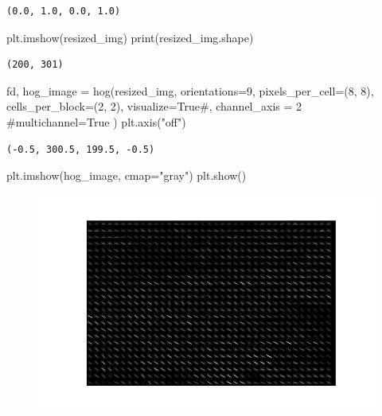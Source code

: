 \documentclass[
  letterpaper,
]{report}
\newenvironment{Shaded}{\begin{snugshade}}{\end{snugshade}}
\newcommand{\BuiltInTok}[1]{\textcolor[rgb]{0.00,0.23,0.31}{#1}}
\newcommand{\CommentTok}[1]{\textcolor[rgb]{0.37,0.37,0.37}{#1}}
\newcommand{\DecValTok}[1]{\textcolor[rgb]{0.68,0.00,0.00}{#1}}
\newcommand{\NormalTok}[1]{\textcolor[rgb]{0.00,0.23,0.31}{#1}}
\newcommand{\OperatorTok}[1]{\textcolor[rgb]{0.37,0.37,0.37}{#1}}
\newcommand{\StringTok}[1]{\textcolor[rgb]{0.13,0.47,0.30}{#1}}
\newcommand{\VariableTok}[1]{\textcolor[rgb]{0.07,0.07,0.07}{#1}}
\begin{document}
\begin{verbatim}
(0.0, 1.0, 0.0, 1.0)
\end{verbatim}

\begin{Shaded}
\begin{Highlighting}[]
\NormalTok{plt.imshow(resized\_img)}
\BuiltInTok{print}\NormalTok{(resized\_img.shape)}
\end{Highlighting}
\end{Shaded}

\begin{verbatim}
(200, 301)
\end{verbatim}

\begin{Shaded}
\begin{Highlighting}[]
\NormalTok{fd, hog\_image }\OperatorTok{=}\NormalTok{ hog(resized\_img, orientations}\OperatorTok{=}\DecValTok{9}\NormalTok{, pixels\_per\_cell}\OperatorTok{=}\NormalTok{(}\DecValTok{8}\NormalTok{, }\DecValTok{8}\NormalTok{),}
\NormalTok{                    cells\_per\_block}\OperatorTok{=}\NormalTok{(}\DecValTok{2}\NormalTok{, }\DecValTok{2}\NormalTok{), visualize}\OperatorTok{=}\VariableTok{True}\CommentTok{\#, channel\_axis = 2 }
                    \CommentTok{\#multichannel=True}
\NormalTok{                    )}
\NormalTok{plt.axis(}\StringTok{"off"}\NormalTok{)}
\end{Highlighting}
\end{Shaded}

\begin{verbatim}
(-0.5, 300.5, 199.5, -0.5)
\end{verbatim}

\begin{Shaded}
\begin{Highlighting}[]
\NormalTok{plt.imshow(hog\_image, cmap}\OperatorTok{=}\StringTok{"gray"}\NormalTok{)}
\NormalTok{plt.show()}
\end{Highlighting}
\end{Shaded}

\begin{figure}[H]

{\centering \includegraphics{results_files/figure-pdf/unnamed-chunk-30-1.pdf}

}

\end{figure}
\end{document}
